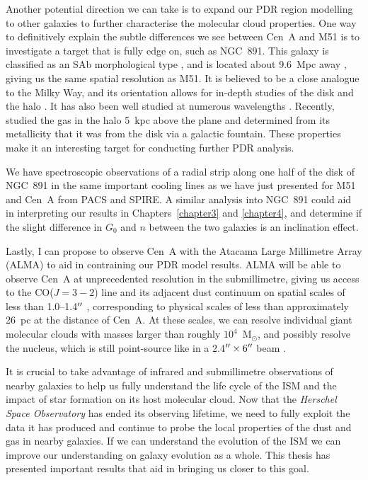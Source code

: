 Another potential direction we can take is to expand our PDR region modelling to other galaxies to further characterise the molecular cloud properties.  One way to definitively explain the subtle differences we see between Cen~A and M51 is to investigate a target that is fully edge on, such as NGC~891.  This galaxy is classified as an SAb morphological type \citep{1991trcb.book.....D}, and is located about 9.6~Mpc away \citep{2004ApJS..151..193S}, giving us the same spatial resolution as M51.  It is believed to be a close analogue to the Milky Way, and its orientation allows for in-depth studies of the disk and the halo \citep{1984A&A...140..470V,1993ApJ...404L..59S,2009MNRAS.395...97W}.  It has also been well studied at numerous wavelengths \citep[e.g.][]{1993ApJ...404L..59S,2009MNRAS.395...97W,2011A&A...531L..11B,2013ApJ...762...12H}.  Recently, \citet{2013ApJ...766...57B} studied the gas in the halo 5~kpc above the plane and determined from its metallicity that it was  from the disk via a galactic fountain.  These properties make it an interesting target for conducting further PDR analysis.

We have spectroscopic observations of a radial strip along one half of the disk of NGC~891 in the same important cooling lines as we have just presented for M51 and Cen~A from PACS and SPIRE.  A similar analysis into NGC~891 could aid in interpreting our results in Chapters~\ref{chapter3} and \ref{chapter4}, and determine if the slight difference in $G_{0}$ and $n$ between the two galaxies is an inclination effect.  

Lastly, I can propose to observe Cen~A with the Atacama Large Millimetre Array (ALMA) to aid in contraining our PDR model results.  ALMA will be able to observe Cen~A at unprecedented resolution in the submillimetre, giving us access to the CO($J=3-2$) line and its adjacent dust continuum on spatial scales of less than 1.0--1.4$\mbox{$^{\prime\prime}$}$ \citep{alma_primer}, corresponding to physical scales of less than approximately 26~pc at the distance of Cen~A.  At these scales, we can resolve individual giant molecular clouds with masses larger than roughly $10^{4}$~M$_{\odot}$, and possibly resolve the nucleus, which is still point-source like in a 2.4$\mbox{$^{\prime\prime}$} \times 6\mbox{$^{\prime\prime}$}$ beam \citep{2009ApJ...695..116E}.

It is crucial to take advantage of infrared and submillimetre observations of nearby galaxies to help us fully understand the life cycle of the ISM and the impact of star formation on its host molecular cloud.  Now that the \emph{Herschel Space Observatory} has ended its observing lifetime, we need to fully exploit the data it has produced and continue to probe the local properties of the dust and gas in nearby galaxies.  If we can understand the evolution of the ISM we can improve our understanding on galaxy evolution as a whole.  This thesis has presented important results that aid in bringing us closer to this goal.

